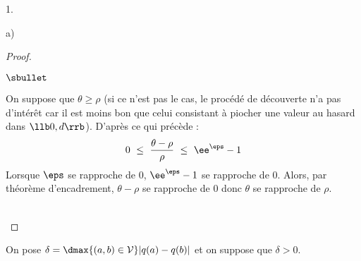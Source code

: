 \begin{noliste}{1.}
\begin{noliste}{a)}
\begin{proof}
\begin{noliste}{$\sbullet$}
      \item On suppose que $\theta \geq \rho$ (si ce n'est pas le cas,
        le procédé de découverte n'a pas d'intérêt car il est moins
        bon que celui consistant à piocher une valeur au hasard dans
        $\llb 0, d\rrb$). D'après ce qui précède :
        \[
        0 \ \leq \ \dfrac{\theta - \rho}{\rho} \ \leq \ \ee^{\eps} - 1
        \]
        Lorsque $\eps$ se rapproche de $0$, $\ee^{\eps} - 1$ se
        rapproche de $0$. Alors, par théorème d'encadrement, $\theta -
        \rho$ se rapproche de $0$ donc $\theta$ se rapproche de $\rho$.
      \end{noliste}
      ~\\[-1.1cm]
    \end{proof}
  \end{noliste}
\end{noliste}
On pose $\delta = \dmax{(a,b)\in\cal V} |q(a)-q(b)|$ et on suppose que
$\delta > 0$.
